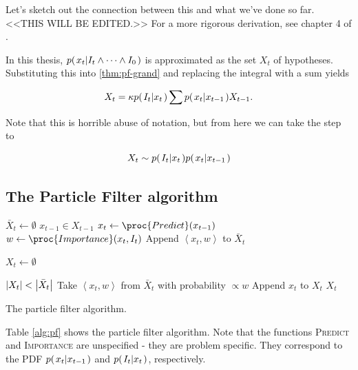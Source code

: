 Let's sketch out the connection between this and what we've done so
far. <<THIS WILL BE EDITED.>> For a more rigorous derivation, see chapter 4 of \cite{ProbRob}.

In this thesis, $p{(\left. x_t \middle\vert I_t \wedge \dots \wedge I_0 \right.)}$ is
approximated as the set $X_t$ of hypotheses. Substituting this into
\eqref{thm:pf-grand} and replacing the integral with a sum yields

\begin{equation}
  X_t = \kappa p{(\left. I_t \middle\vert x_t \right.)} \sum { p{(\left. x_t \middle\vert x_{t-1} \right.)} X_{t-1} }.
\end{equation}

Note that this is horrible abuse of notation, but from here we can
take the step to

\begin{equation}
  X_t \sim p{(\left. I_t \middle\vert x_t \right.)} p{(\left. x_t \middle\vert x_{t-1} \right.)}
\end{equation}

\subsection{The Particle Filter algorithm}
\begin{table}
  \begin{codebox}
    \li $\bar{X}_t \gets \emptyset$
    \li \ForEach $x_{t-1} \in X_{t-1}$
    \li \Do
    \li $x_t \gets \proc{Predict}(x_{t-1})$
    \li $w \gets \proc{Importance}(x_t,I_t)$
    \li Append $\left<x_t, w\right>$ to $\bar{X}_t$
    \End
    \li
    
    \li $X_t \gets \emptyset$
    
    \li \While $\left\vert X_t \right\vert < \left\vert \bar{X}_t \right\vert$
    \li \Do
    \li Take $\left<x_t, w\right>$ from $\bar{X}_t$ with probability $\propto w$
    \li Append $x_t$ to $X_t$
    \End
    \li \Return $X_t$
  \end{codebox}
  \caption{The particle filter algorithm.}
  \label{alg:pf}
\end{table}

Table \ref{alg:pf} shows the particle filter algorithm. Note that the
functions \textsc{Predict} and \textsc{Importance} are unspecified -
they are problem specific. They correspond to the PDF $p{(\left. x_t \middle\vert x_{t-1} \right.)}$
and $p{(\left. I_t \middle\vert x_t \right.)}$, respectively.


